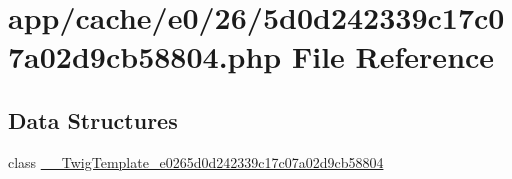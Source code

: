 \hypertarget{5d0d242339c17c07a02d9cb58804_8php}{\section{app/cache/e0/26/5d0d242339c17c07a02d9cb58804.php File Reference}
\label{5d0d242339c17c07a02d9cb58804_8php}
}
\subsection*{Data Structures}
\begin{DoxyCompactItemize}
\item 
class \hyperlink{class_____twig_template__e0265d0d242339c17c07a02d9cb58804}{\-\_\-\-\_\-\-Twig\-Template\-\_\-e0265d0d242339c17c07a02d9cb58804}
\end{DoxyCompactItemize}
